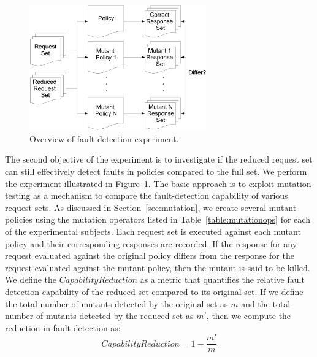 \begin{figure}[t]
    \centering
\includegraphics[width=3in]{coverage/mutant-exp}
\caption{Overview of fault detection experiment.}
\label{fig:mutant_exp}
\end{figure}

The second objective of the experiment is to investigate if the
reduced request set can still effectively detect faults in policies
compared to the full set. We perform the experiment illustrated in
Figure~\ref{fig:mutant_exp}.  The basic approach is to exploit
mutation testing as a mechanism to compare the fault-detection
capability of various request sets.  As discussed in
Section~\ref{sec:mutation}, we create several mutant policies using
the mutation operators listed in Table~\ref{table:mutationops} for
each of the experimental subjects. Each request set is executed
against each mutant policy and their corresponding responses are
recorded.  If the response for any request evaluated against the
original policy differs from the response for the request evaluated
against the mutant policy, then the mutant is said to be killed. We
define the $CapabilityReduction$ as a metric that quantifies the
relative fault detection capability of the reduced set compared to
its original set. If we define the total number of mutants detected
by the original set as $m$ and the total number of mutants detected
by the reduced set as $m'$, then we compute the reduction in fault
detection as:
\begin{displaymath}
CapabilityReduction=1 - \frac{m'}{m}
\end{displaymath}

